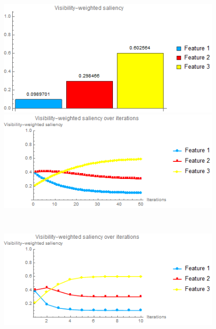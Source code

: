 \begin{figure}
\begin{minipage}{.24\textwidth}
		\subcaption{}
	\end{minipage}~
	\begin{minipage}{.24\textwidth}
		\includegraphics[width=1\linewidth]{images/tooth_naive_optimized_linesearch_visibility_saliency_weighted_chart}
		\subcaption{}
	\end{minipage}
	
	\begin{minipage}{.49\textwidth}
		\includegraphics[width=1\linewidth]{images/tooth_naive_saliency_fixed}
		\subcaption{}
	\end{minipage}~
	\begin{minipage}{.49\textwidth}
		\includegraphics[width=1\linewidth]{images/tooth_naive_saliency_parallelsearch}
		\subcaption{}
	\end{minipage}
	

\end{figure}
